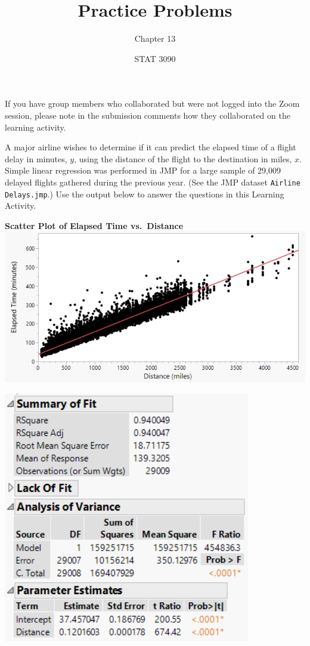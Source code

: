 \documentclass[noanswers]{exam}
\title{Practice Problems}
\author{Chapter 13}
\date{STAT 3090}
\begin{document}
%
\noindent If you have group members who collaborated but were not logged into the Zoom session, please note in the submission comments how they collaborated on the learning activity.

\vspace{5mm}

\noindent A major airline wishes to determine if it can predict the elapsed time of a flight delay in minutes, $y$, using the distance of the flight to the destination in miles, $x$. Simple linear regression was performed in JMP for a large sample of 29,009 delayed flights gathered during the previous year. (See the JMP dataset \verb|Airline Delays.jmp|.) Use the output below to answer the questions in this Learning Activity.

\begin{multicols}{2}
	\noindent \textbf{Scatter Plot of Elapsed Time vs.\ Distance}
	\includegraphics[scale=.55]{STAT_3090_Ch13_ScatterPlot.PNG}
	\begin{flushright}
	\includegraphics[scale=.75]{STAT_3090_Ch13_LinReg.PNG}
	\end{flushright}
\end{multicols}
\end{document}
